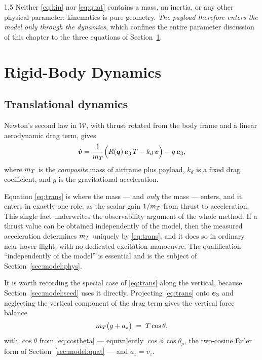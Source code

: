 \begin{spacing}{1.5}
Neither \eqref{eq:kin} nor \eqref{eq:quat} contains a mass, an inertia, or any
other physical parameter: kinematics is pure geometry. \emph{The payload
therefore enters the model only through the dynamics}, which confines the entire
parameter discussion of this chapter to the three equations of
Section~\ref{sec:model:dyn}.

\section{Rigid-Body Dynamics}\label{sec:model:dyn}

\subsection{Translational dynamics}\label{sec:model:trans}

Newton's second law in $\mathcal{W}$, with thrust rotated from the body frame and
a linear aerodynamic drag term, gives
\begin{equation}
\dot{\bm{v}} = \frac{1}{m_T}\Bigl( R(\bm{q})\, \bm{e}_3\, T - k_d\, \bm{v} \Bigr) - g\, \bm{e}_3,
\label{eq:trans}
\end{equation}
where $m_T$ is the \emph{composite} mass of airframe plus payload, $k_d$ is a
fixed drag coefficient, and $g$ is the gravitational acceleration.

Equation \eqref{eq:trans} is where the mass --- and \emph{only} the mass ---
enters, and it enters in exactly one role: as the scalar gain $1/m_T$ from thrust
to acceleration. This single fact underwrites the observability argument of the
whole method. If a thrust value can be obtained independently of the model, then
the measured acceleration determines $m_T$ uniquely by \eqref{eq:trans}, and it
does so in ordinary near-hover flight, with no dedicated excitation manoeuvre.
The qualification ``independently of the model'' is essential and is the subject
of Section~\ref{sec:model:phys}.

It is worth recording the special case of \eqref{eq:trans} along the vertical,
because Section~\ref{sec:model:seed} uses it directly. Projecting \eqref{eq:trans}
onto $\bm{e}_3$ and neglecting the vertical component of the drag term gives the
vertical force balance
\begin{equation}
m_T\bigl(g + a_z\bigr) \;=\; T\cos\theta ,
\label{eq:vbal}
\end{equation}
with $\cos\theta$ from \eqref{eq:costheta} --- equivalently
$\cos\phi\,\cos\theta_p$, the two-cosine Euler form of
Section~\ref{sec:model:quat} --- and $a_z=\dot v_z$.


\end{spacing}

